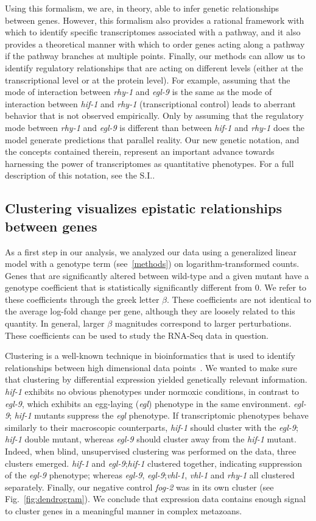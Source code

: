 \documentclass[9pt,twocolumn,twoside]{pnas-new}
\newcommand{\egl}{\emph{egl-9}}
\newcommand{\rhy}{\emph{rhy-1}}
\newcommand{\vhl}{\emph{vhl-1}}
\newcommand{\hif}{\emph{hif-1}}
\newcommand{\fog}{\emph{fog-2}}
\begin{document}
Using this formalism, we are, in theory, able to infer genetic relationships between genes. However, this formalism also provides a rational framework with which to identify specific transcriptomes associated with a pathway, and it also provides a theoretical manner with which to order genes acting along a pathway if the pathway branches at multiple points. Finally, our methods can allow us to identify regulatory relationships that are acting on different levels (either at the transcriptional level or at the protein level).
For example, assuming that the mode of interaction between \rhy{} and \egl{} is the same as the mode of interaction between \hif{} and \rhy{} (transcriptional control) leads to aberrant behavior that is not observed empirically. Only by assuming that the regulatory mode between \rhy{} and \egl{} is different than between \hif{} and \rhy{} does the model generate predictions that parallel reality. Our new genetic notation, and the concepts contained therein, represent an important advance towards harnessing the power of transcriptomes as quantitative phenotypes. For a full description of this notation, see the S.I..

\subsection{Clustering visualizes epistatic relationships between genes}
\label{sub:Clustering}

As a first step in our analysis, we analyzed our data using a generalized linear model with a genotype term (see~\ref{methods}) on logarithm-transformed counts. Genes that are significantly altered between wild-type and a given mutant have a genotype coefficient that is statistically significantly different from 0. We refer to these coefficients through the greek letter $\beta$. These coefficients are not identical to the average log-fold change per gene, although they are loosely related to this quantity. In general, larger $\beta$ magnitudes correspond to larger perturbations. These coefficients can be used to study the RNA-Seq data in question.

Clustering is a well-known technique in bioinformatics that is used to identify relationships between high dimensional data points~\cite{Yeung2003}. We wanted to make sure that clustering by differential expression yielded genetically relevant information. \hif{} exhibits no obvious phenotypes under normoxic conditions, in contrast to \egl{}, which exhibits an egg-laying (\emph{egl}) phenotype in the same environment. \egl{}; \hif{} mutants suppress the \emph{egl} phenotype. If transcriptomic phenotypes behave similarly to their macroscopic counterparts, \hif{} should cluster with the \egl{}; \hif{} double mutant, whereas \egl{} should cluster away from the \hif{} mutant.
Indeed, when blind, unsupervised clustering was performed on the data, three clusters emerged. \hif{} and \egl{};\hif{} clustered together, indicating suppression of the \egl{} phenotype; whereas \egl{}, \egl{};\vhl{}, \vhl{} and \rhy{} all clustered separately. Finally, our negative control \fog{} was in its own cluster (see Fig.~\ref{fig:dendrogram}). We conclude that expression data contains enough signal to cluster genes in a meaningful manner in complex metazoans.
\end{document}
